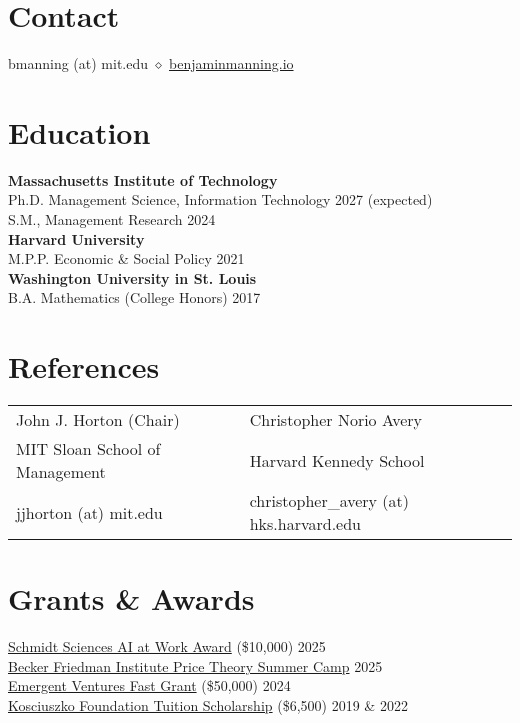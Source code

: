 \documentclass[margin,line,pifont,palatino,courier, 9pt]{res}
\begin{document}
\begin{resume}


\large


\section{\sc Contact}
bmanning (at) mit.edu $\diamond$ \href{https://benjaminmanning.io/}{benjaminmanning.io}

\section{\sc Education}
{\bf Massachusetts Institute of Technology}\\
Ph.D. Management Science, Information Technology \hfill 2027 (expected) \\
S.M., Management Research \hfill 2024\vspace{2mm}\\
{\bf Harvard University}\\
M.P.P. Economic \& Social Policy \hfill 2021\vspace{2mm}\\
{\bf Washington University in St. Louis}\\
B.A. Mathematics (College Honors) \hfill 2017

\section{\sc References}
\vspace{.15cm}
\begin{tabular}{@{}p{2.6in}p{2.75in}}
John J. Horton (Chair)& Christopher Norio Avery\\
MIT Sloan School of Management & Harvard Kennedy School \\
jjhorton (at) mit.edu & christopher\_avery (at) hks.harvard.edu\\
\end{tabular}

\section{\sc Grants \& Awards}
\href{https://www.schmidtsciences.org/ai-at-work/}{Schmidt Sciences AI at Work Award} (\$10,000) \hfill 2025 \\
\href{https://bfi.uchicago.edu/events/event/2025-price-theory-summer-camp/}{Becker Friedman Institute Price Theory Summer Camp} \hfill 2025 \\
\href{https://www.mercatus.org/emergent-ventures}{Emergent Ventures Fast Grant} (\$50,000) \hfill 2024 \\
\href{https://thekf.org/scholarship/tuition-scholarships/tuition-scholarships-for-graduate-studies/}{Kosciuszko Foundation Tuition Scholarship} (\$6,500) \hfill 2019 \& 2022 


\end{resume}
\end{document}
